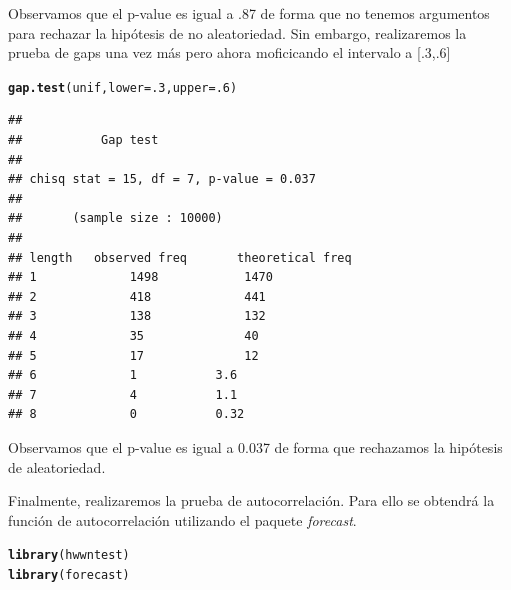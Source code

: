 \documentclass[12 pt]{article}\usepackage[]{graphicx}\usepackage[]{color}
\makeatletter
\newcommand{\hlnum}[1]{\textcolor[rgb]{0.686,0.059,0.569}{#1}}%
\newcommand{\hlstd}[1]{\textcolor[rgb]{0.345,0.345,0.345}{#1}}%
\newcommand{\hlkwc}[1]{\textcolor[rgb]{0.333,0.667,0.333}{#1}}%
\newcommand{\hlkwd}[1]{\textcolor[rgb]{0.737,0.353,0.396}{\textbf{#1}}}%
\newenvironment{kframe}{%
 \def\at@end@of@kframe{}%
 \ifinner\ifhmode%
  \def\at@end@of@kframe{\end{minipage}}%
  \begin{minipage}{\columnwidth}%
 \fi\fi%
 \def\FrameCommand##1{\hskip\@totalleftmargin \hskip-\fboxsep
 \colorbox{shadecolor}{##1}\hskip-\fboxsep
     \hskip-\linewidth \hskip-\@totalleftmargin \hskip\columnwidth}%
 \MakeFramed {\advance\hsize-\width
   \@totalleftmargin\z@ \linewidth\hsize
   \@setminipage}}%
 {\par\unskip\endMakeFramed%
 \at@end@of@kframe}
\newenvironment{knitrout}{}{} %
\makeatother
\begin{document}
\begin{enumerate}
Observamos que el p-value es igual a .87 de forma que no tenemos argumentos para rechazar la hipótesis de no aleatoriedad. Sin embargo, realizaremos la prueba de gaps una vez más pero ahora moficicando el intervalo a [.3,.6]

\begin{knitrout}
\color{fgcolor}\begin{kframe}
\begin{alltt}
\hlkwd{gap.test}\hlstd{(unif,} \hlkwc{lower} \hlstd{=} \hlnum{.3}\hlstd{,} \hlkwc{upper} \hlstd{=} \hlnum{.6}\hlstd{)}
\end{alltt}
\begin{verbatim}
## 
## 			 Gap test
## 
## chisq stat = 15, df = 7, p-value = 0.037
## 
## 		 (sample size : 10000)
## 
## length	observed freq		theoretical freq
## 1 			 1498 			 1470 
## 2 			 418 			 441 
## 3 			 138 			 132 
## 4 			 35 			 40 
## 5 			 17 			 12 
## 6 			 1 			 3.6 
## 7 			 4 			 1.1 
## 8 			 0 			 0.32
\end{verbatim}
\end{kframe}
\end{knitrout}

Observamos que el p-value es igual a 0.037 de forma que rechazamos la hipótesis de aleatoriedad.

Finalmente, realizaremos la prueba de autocorrelación. Para ello se obtendrá la función de autocorrelación utilizando el paquete \textit{forecast}.

\begin{knitrout}
\color{fgcolor}\begin{kframe}
\begin{alltt}
\hlkwd{library}\hlstd{(hwwntest)}
\hlkwd{library}\hlstd{(forecast)}


\end{alltt}
\end{kframe}
\end{knitrout}
\end{enumerate}
\end{document}
